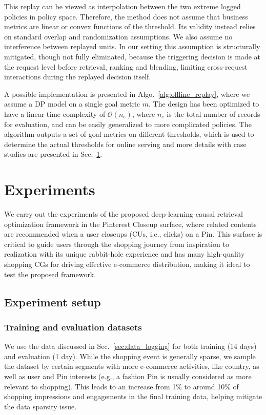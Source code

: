 \documentclass[sigconf, authorversion]{acmart}
\begin{document}
This replay can be viewed as interpolation between the two extreme logged policies in policy space. Therefore, the method does not assume that business metrics are linear or convex functions of the threshold. Its validity instead relies on standard overlap and randomization assumptions.
We also assume no interference between replayed units. In our setting this assumption is structurally mitigated, though not fully eliminated, because the triggering decision is made at the request level before retrieval, ranking and blending, limiting cross-request interactions during the replayed decision itself.

A possible implementation is presented in Algo.~\ref{alg:offline_replay}, where we assume a DP model on a single goal metric $m$. The design has been optimized to have a linear time complexity of $\mathcal{O}(n_e)$, where $n_e$ is the total number of records for evaluation, and can be easily generalized to more complicated policies. The algorithm outputs a set of goal metrics on different thresholds, which is used to determine the actual thresholds for online serving and more details with case studies are presented in Sec.~\ref{sec:experiments}.

\section{Experiments} \label{sec:experiments}
We carry out the experiments of the proposed deep-learning causal retrieval optimization framework in the Pinterest Closeup surface, where related contents are recommended when a user closeups (CUs, i.e., clicks) on a Pin. This surface is critical to guide users through the shopping journey from inspiration to realization with its unique rabbit-hole experience and has many high-quality shopping CGs for driving effective e-commerce distribution, making it ideal to test the proposed framework.

\subsection{Experiment setup}
\subsubsection{Training and evaluation datasets} We use the data discussed in Sec.~\ref{sec:data_logging} for both training (14 days) and evaluation (1 day). While the shopping event is generally sparse, we sample the dataset by certain segments with more e-commerce activities, like country, as well as user and Pin interests (e.g., a fashion Pin is usually considered as more relevant to shopping). This leads to an increase from 1\% to around 10\% of shopping impressions and engagements in the final training data, helping mitigate the data sparsity issue. 
\end{document}

